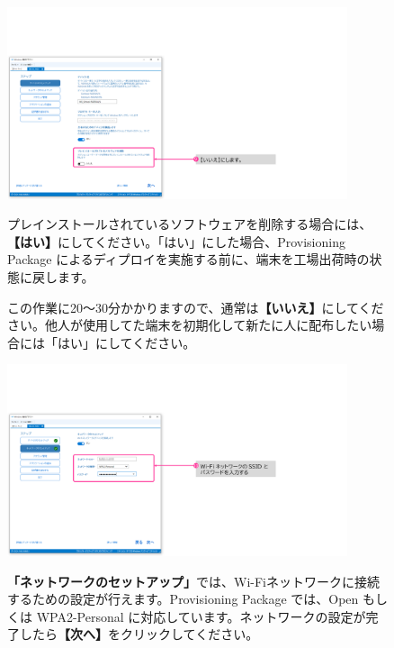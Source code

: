 \begin{figure}[hp]
    \begin{minipage}{0.6\textwidth}
        \vspace{-1cm}
        \includegraphics[width=10cm]{figures/MakeProvisioningPackage-08}
    \end{minipage}
    \begin{minipage}{0.4\textwidth}
        プレインストールされているソフトウェアを削除する場合には、\textbf{【はい】}にしてください。「はい」にした場合、Provisioning Package によるディプロイを実施する前に、端末を工場出荷時の状態に戻します。

        この作業に20～30分かかりますので、通常は\textbf{【いいえ】}にしてください。他人が使用してた端末を初期化して新たに人に配布したい場合には「はい」にしてください。
    \end{minipage}
\end{figure}

\begin{figure}[hp]
    \begin{minipage}{0.6\textwidth}
        \vspace{-1cm}
        \includegraphics[width=10cm]{figures/MakeProvisioningPackage-09}
    \end{minipage}
    \begin{minipage}{0.4\textwidth}
        \textbf{「ネットワークのセットアップ」}では、Wi-Fiネットワークに接続するための設定が行えます。Provisioning Package では、Open もしくは WPA2-Personal に対応しています。ネットワークの設定が完了したら\textbf{【次へ】}をクリックしてください。
    \end{minipage}
\end{figure}


